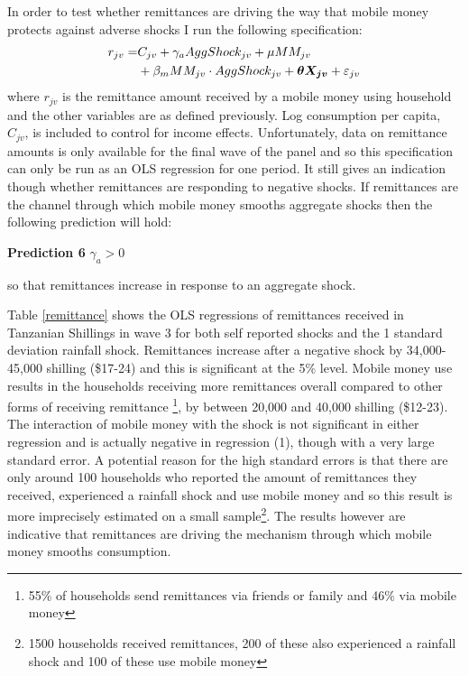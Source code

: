 In order to test whether remittances are driving the way that mobile money protects against adverse shocks I run the following specification: 
\begin{align}
r_{jv}=& C_{jv} + \gamma_a AggShock_{jv} + \mu MM_{jv} \notag \\ 
& + \beta_m MM_{jv}\cdot AggShock_{jv} + \bm{\theta X_{jv}} + \varepsilon_{jv} 
\end{align}
where $r_{jv}$ is the remittance amount received by a mobile money using household and the other variables are as defined previously. Log consumption per capita, $C_{jv}$, is included to control for income effects. Unfortunately, data on remittance amounts is only available for the final wave of the panel and so this specification can only be run as an OLS regression for one period. It still gives an indication though whether remittances are responding to negative shocks. If remittances are the channel through which mobile money smooths aggregate shocks then the following prediction will hold:
\begin{description}
\item{\bf{Prediction 6}} $\gamma_a>0$
\end{description}
so that remittances increase in response to an aggregate shock.   


Table \ref{remittance} shows the OLS regressions of remittances received in Tanzanian Shillings in wave 3 for both self reported shocks and the 1 standard deviation rainfall shock. Remittances increase after a negative shock by 34,000-45,000 shilling (\$17-24) and this is significant at the 5\% level. Mobile money use results in the households receiving more remittances overall compared to other forms of receiving remittance \footnote{55\% of households send remittances via friends or family and 46\% via mobile money}, by between 20,000 and 40,000 shilling (\$12-23). The interaction of mobile money with the shock is not significant in either regression and is actually  negative in regression (1), though with a very large standard error. A potential reason for the high standard errors is that there are only around 100 households who reported the amount of remittances they received, experienced a rainfall shock and use mobile money  and so this result is more imprecisely estimated on a small sample\footnote{1500 households received remittances, 200 of these also experienced a rainfall shock and 100 of these use mobile money}. The results however are indicative that remittances are driving the mechanism through which mobile money smooths consumption. 

